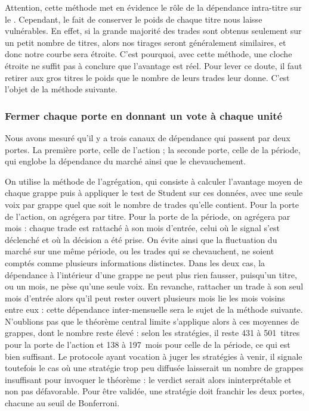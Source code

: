 Attention, cette méthode met en évidence le rôle de la dépendance intra-titre
sur le \edgevar{}. Cependant, le fait de conserver le poids de chaque titre nous laisse
vulnérables. En effet, si la grande majorité des trades sont obtenus seulement sur
un petit nombre de titres, alors nos tirages seront généralement similaires,
et donc notre courbe sera étroite.
C'est pourquoi, avec cette méthode, une cloche étroite ne suffit pas à
conclure que l'avantage est réel.
Pour lever ce doute, il faut retirer aux gros titres le poids que le nombre
de leurs trades leur donne. C'est l'objet de la méthode suivante.

\subsubsection*{Fermer chaque porte en donnant un vote à chaque unité}

Nous avons mesuré qu'il y a trois canaux de dépendance qui passent par deux portes.
La première porte, celle de l'action ; la seconde porte, celle de la période, qui
englobe la dépendance du marché ainsi que le chevauchement.

On utilise la méthode de l'agrégation, qui consiste à calculer l'avantage moyen
de chaque grappe puis à appliquer le test de Student sur ces données, avec une
seule voix par grappe quel que soit le nombre de trades qu'elle contient.
Pour la porte de l'action, on agrégera par titre. Pour la porte de la période,
on agrégera par mois : chaque trade est rattaché à son mois d'entrée, celui où
le signal s'est déclenché et où la décision a été prise. On évite ainsi que la
fluctuation du marché sur une même période, ou les trades qui se chevauchent,
ne soient comptés comme plusieurs informations distinctes.
Dans les deux cas, la dépendance à l'intérieur d'une grappe ne peut plus rien
fausser, puisqu'un titre, ou un mois, ne pèse qu'une seule voix. En revanche,
rattacher un trade à son seul mois d'entrée alors qu'il peut rester ouvert
plusieurs mois lie les mois voisins entre eux : cette dépendance inter-mensuelle
sera le sujet de la méthode suivante.
N'oublions pas que le théorème central limite s'applique alors à ces moyennes
de grappes, dont le nombre reste élevé : selon les stratégies, il reste 431 à
501~titres pour la porte de l'action et 138 à 197~mois pour celle de la période,
ce qui est bien suffisant. Le protocole ayant vocation à juger les stratégies à
venir, il signale toutefois le cas où une stratégie trop peu diffusée
laisserait un nombre de grappes insuffisant pour invoquer le théorème : le
verdict serait alors ininterprétable et non pas défavorable. Pour être validée,
une stratégie doit franchir les deux portes, chacune au seuil de Bonferroni.

